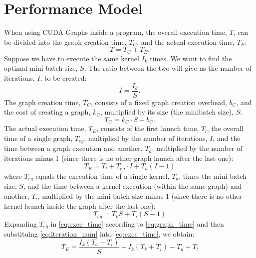 \documentclass[10pt,twocolumn]{article}
\begin{document}
\section{Performance Model}
\label{sec:performance_model}
When using CUDA Graphs inside a program, the overall execution time, \(T\), can be divided into the graph creation time, \(T_C\), and the actual execution time, \(T_E\):
\begin{equation}
\label{eq:overall_time}
T = T_C + T_E.
\end{equation}
Suppose we have to execute the same kernel \(I_k\) times. We want to find the optimal mini-batch size, \(S\). The ratio between the two will give us the number of iterations, \(I\), to be created:
\begin{equation}
\label{eq:iteration_num}
I = \frac{I_k}{S}.
\end{equation}
The graph creation time, \(T_C\), consists of a fixed graph creation overhead, \(b_C\), and the cost of creating a graph, \(k_C\), multiplied by its size (the minibatch size), \(S\):
\begin{equation}
T_C = k_C \cdot S + b_C.
\end{equation}
The actual execution time, \(T_E\), consists of the first launch time, \(T_l\), the overall time of a single graph, \(T_{eg}\), multiplied by the number of iterations, \(I\), and the time between a graph execution and another, \(T_a\), multiplied by the number of iterations minus 1 (since there is no other graph launch after the last one):
\begin{equation}
\label{eq:exec_time}
T_{E} = T_{l} + T_{eg}\cdot I + T_{a}(I-1)
\end{equation}
where \(T_{eg}\) equals the execution time of a single kernel, \(T_k\), times the mini-batch size, \(S\), and the time between a kernel execution (within the same graph) and another, \(T_i\), multiplied by the mini-batch size minus 1 (since there is no other kernel launch inside the graph after the last one): 
\begin{equation}
\label{eq:graph_time}
T_{eg} = T_{k}S + T_{i}(S-1)
\end{equation}
Expanding \(T_{eg}\) in \ref{eq:exec_time} according to \ref{eq:graph_time} and then substituing \ref{eq:iteration_num} into \ref{eq:exec_time}, we obtain:
\begin{equation}
\label{eq:exec_time_v2}
T_E = \frac{I_{k}(T_{a}-T_{i})}{S} + I_{k}(T_{k} + T_{i}) - T_{a} + T_{l} 
\end{equation}
\end{document}
